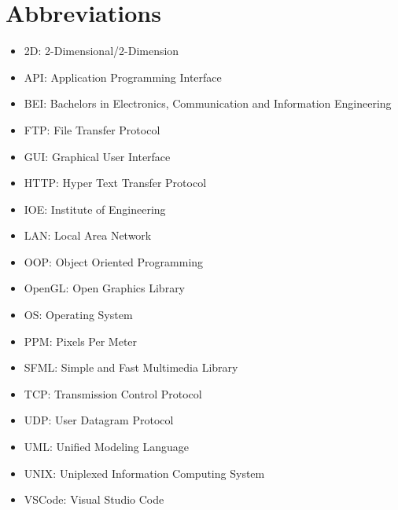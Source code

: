 \documentclass[main]{subfiles}
\begin{document}
	\chapter*{\centering Abbreviations}
	\begin{itemize}
	    \item 2D: 2-Dimensional/2-Dimension
	    \item API: Application Programming Interface
	    \item BEI: Bachelors in Electronics, Communication and Information Engineering
	    \item FTP: File Transfer Protocol
		\item GUI: Graphical User Interface
		\item HTTP: Hyper Text Transfer Protocol
		\item IOE: Institute of Engineering
		\item LAN: Local Area Network
		\item OOP: Object Oriented Programming
		\item OpenGL: Open Graphics Library
		\item OS: Operating System
		\item PPM: Pixels Per Meter
		\item SFML: Simple and Fast Multimedia Library
		\item TCP: Transmission Control Protocol
		\item UDP: User Datagram Protocol
		\item UML: Unified Modeling Language
		\item UNIX: Uniplexed Information Computing System
		\item VSCode: Visual Studio Code
	\end{itemize}
\end{document}
